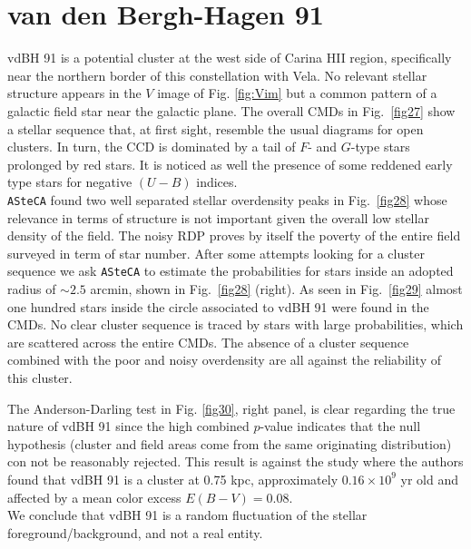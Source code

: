 \documentclass[draft]{aa}
\begin{document}
\section{van den Bergh-Hagen 91}

vdBH 91 is a potential cluster at the west side of Carina HII
region, specifically near the northern border of this constellation with Vela.
No relevant stellar structure appears in the $V$ image of Fig. \ref{fig:Vim}
but a common pattern of a galactic field star near the galactic plane.
The overall CMDs in Fig.~\ref{fig27} show a stellar sequence that, at first
sight, resemble the usual diagrams for open clusters. In turn, the CCD
is dominated by a tail of $F$- and $G$-type stars prolonged by red stars. It is
noticed as well the presence of some reddened early type stars for negative
$(U-B)$ indices.\\

\texttt{ASteCA} found two well separated stellar overdensity peaks in
Fig.~\ref{fig28} whose relevance in terms of structure is not
important given the overall low stellar density of the field.
The noisy RDP proves by itself the poverty of the entire field surveyed in term
of star number.
After some attempts looking for a cluster sequence we ask \texttt{ASteCA} to
estimate the probabilities for stars inside an adopted radius
of $\sim2.5$ arcmin, shown in Fig.~\ref{fig28} (right).
As seen in Fig.~\ref{fig29} almost one hundred stars inside the circle
associated to vdBH 91 were found in the CMDs.
No clear cluster sequence is traced by stars with large probabilities, which
are scattered across the entire CMDs. The absence of a cluster sequence
combined with the poor and noisy overdensity are all against the reliability of
this cluster.

The Anderson-Darling test in Fig. \ref{fig30}, right panel, is clear regarding
the true nature of vdBH 91 since the high combined $p$-value
indicates that the null hypothesis (cluster and field areas come from the same
originating distribution) con not be reasonably rejected. This result is against
the \cite{Kharchenko_2005} study where the authors found that vdBH 91
is a cluster at 0.75 kpc, approximately $0.16\times10^9$ yr old and affected by
a mean color excess $E(B-V)=0.08$.\\

We conclude that vdBH 91 is a random fluctuation of the stellar
foreground/background, and not a real entity.
\end{document}
